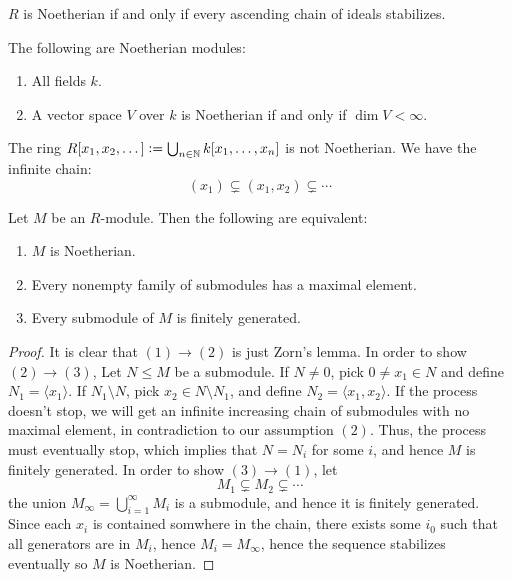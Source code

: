 \documentclass[11pt,a4paper]{article}
\begin{document}
\begin{remark}
  $R$ is Noetherian if and only if every ascending chain of ideals
  stabilizes.
\end{remark}

\begin{example}
  The following are Noetherian modules:
  \begin{enumerate}
    \item[(1)] All fields $k$.
    \item[(2)] A vector space $V$ over $k$ is Noetherian if and
      only if $\dim V < \infty$.
  \end{enumerate}
\end{example}

\begin{example}
  The ring $R[x_1,x_2,\dots] := \bigcup_{n \in \mathbb{N}} k[x_1,\dots,x_n]$
  is not Noetherian.
  We have the infinite chain:
  \[
    (x_1) \subsetneq (x_1,x_2) \subsetneq \cdots
  \]
\end{example}

\begin{lemma}
  Let $M$ be an $R$-module.
  Then the following are equivalent:
  \begin{enumerate}
    \item[(1)] $M$ is Noetherian.
    \item[(2)] Every nonempty family of submodules has a maximal element.
    \item[(3)] Every submodule of $M$ is finitely generated.
  \end{enumerate}
\end{lemma}
\begin{proof}
  It is clear that $(1) \to (2)$ is just Zorn's lemma.
  In order to show $(2) \to (3)$,
  Let $N \leqslant M$ be a submodule.
  If $N \neq 0$, pick $0 \neq x_1 \in N$ and define
  $N_1 = \langle x_1 \rangle$.
  If $N_1 \setminus N$, pick $x_2 \in N \setminus N_1$,
  and define $N_2 = \langle x_1, x_2 \rangle$.
  If the process doesn't stop, we will get an infinite increasing
  chain of submodules with no maximal element, in contradiction
  to our assumption $(2)$.
  Thus, the process must eventually stop, which implies that
  $N = N_i$ for some $i$, and hence $M$ is finitely generated.
  In order to show $(3) \to (1)$,
  let
  \[
    M_1 \subsetneq M_2 \subsetneq \cdots
  \]
  the union $M_{\infty} = \bigcup_{i=1}^{\infty} M_i$
  is a submodule, and hence it is finitely
  generated.
  Since each $x_i$ is contained somwhere in the chain,
  there exists some $i_0$ such that all generators
  are in $M_i$, hence $M_i = M_{\infty}$,
  hence the sequence stabilizes eventually so $M$ is
  Noetherian.
\end{proof}
\end{document}
